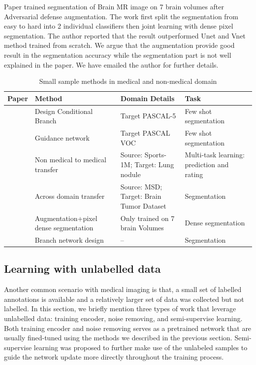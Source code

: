 Paper \cite{suk_brain_2019} trained segmentation of Brain MR image on 7 brain volumes after Adversarial defense augmentation. The work first split the segmentation from easy to hard into 2 individual classifiers then joint learning with dense pixel segmentation. The author reported that the result outperformed Unet and Vnet method trained from scratch. We argue that the augmentation provide good result in the segmentation accuracy while the segmentation part is not well explained in the paper. We have emailed the author for further details.

\begin{table}
\begin{tabular}{p{1cm} p{5cm} p{4cm} p{4cm}}
\hline
Paper    & Method                                & Domain Details                                          & Task                                       \\
\hline
{\cite{shaban_one-shot_2017}} & Design Conditional Branch             & Target PASCAL-5        & Few shot segmentation                      \\
{\cite{rakelly_few-shot_nodate}} & Guidance network                      & Target PASCAL VOC             & Few shot segmentation                      \\
{\cite{hussein_risk_2017}} & Non medical to medical transfer       & Source: Sports-1M;  Target: Lung nodule                  & Multi-task learning: prediction and rating \\
{\cite{wang_improving_2019}} & Across domain transfer                & Source: MSD; Target: Brain Tumor Dataset & Segmentation                               \\
{\cite{shaban_one-shot_2017}} & Augmentation+pixel dense segmentation & Only trained on 7 brain Volumes                         & Dense segmentation                         \\
{\cite{suk_brain_2019}}  & Branch network design                 & --                                                      & Segmentation                               \\
\hline
\end{tabular}
\caption{Small sample methods in medical and non-medical domain}
\label{tab:small sample learning}
\end{table}	

\subsection{Learning with unlabelled data}
Another common scenario with medical imaging is that, a small set of labelled annotations is available and a relatively larger set of data was collected but not labelled. In this section, we briefly mention three types of work that leverage unlabelled data: training encoder, noise removing, and semi-supervise learning. Both training encoder and noise removing serves as a pretrained network that are usually fined-tuned using the methods we described in the previous section. Semi-supervise learning was proposed to further make use of the unlabeled samples to guide the network update more directly throughout the training process.

